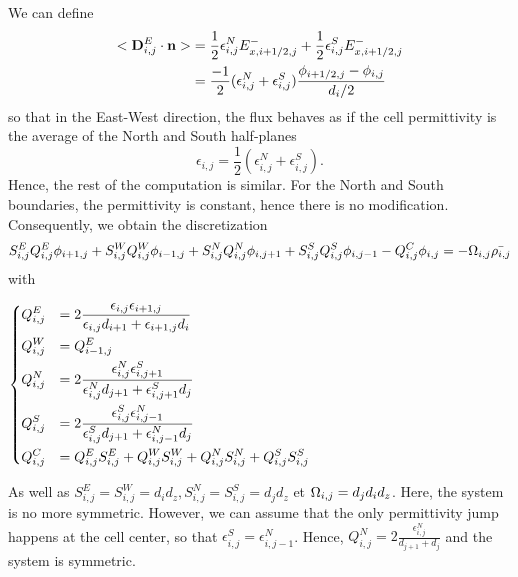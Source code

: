     We can define
    \begin{align}
    <{\mathbf D}^E_{i,j} \cdot {\mathbf n} >&= \frac{1}{2} \epsilon_{i,j}^N E_{x, i+1/2,j}^- + \frac{1}{2} \epsilon_{i,j}^S E_{x, i+1/2,j}^-\\
     &= \frac{-1}{2} (\epsilon_{i,j}^N + \epsilon_{i,j}^S) \frac{\phi_{i+1/2,j} - \phi_{i,j}}{d_i/2}
     \label{eq-flux}
    \end{align}
    so that in the East-West direction, the flux behaves as if the cell permittivity is the average of the North and South half-planes  $$\epsilon_{i,j} = \frac{1}{2} (\epsilon_{i,j}^N + \epsilon_{i,j}^S).$$
    Hence, the rest of the computation is similar.
    For the North and South boundaries, the permittivity is constant, hence there is no modification.
    Consequently, we obtain the discretization
    \begin{equation}
    S^E_{i,j} Q^E_{i,j} \phi_{i+1,j} + S^W_{i,j} Q^W_{i,j} \phi_{i-1,j} + S^N_{i,j} Q^N_{i,j} \phi_{i,j+1} + S^S_{i,j} Q^S_{i,j} \phi_{i,j-1} - Q^C_{i,j} \phi_{i,j} = - \Omega_{i,j} \bar{\rho_{i,j}}
    \label{eq-descretPoissoncentered}
    \end{equation}
    with
    \begin{center}
     $\begin{dcases}
     Q^E_{i,j} &= 2\frac{\epsilon_{i,j} \epsilon_{i+1,j}}{\epsilon_{i,j} d_{i+1} + \epsilon_{i+1,j} d_i} \\
     Q^W_{i,j} &= Q^E_{i-1,j} \\
     Q^N_{i,j} &= 2\frac{\epsilon_{i,j}^N \epsilon_{i,j+1}^S}{\epsilon_{i,j}^N d_{j+1} + \epsilon_{i,j+1}^S d_{j}}\\
     Q^S_{i,j} &= 2\frac{\epsilon_{i,j}^S \epsilon_{i,j-1}^N}{\epsilon_{i,j}^S d_{j+1} + \epsilon_{i,j-1}^N d_{j}} \\
     Q^C_{i,j} &= Q^E_{i,j}S^E_{i,j}+Q^W_{i,j}S^W_{i,j}+Q^N_{i,j}S^N_{i,j}+Q^S_{i,j}S^S_{i,j}
     \end{dcases}$
    \end{center}

    As well as $S^E_{i,j} = S^W_{i,j} =d_id_z, S^N_{i,j} = S^S_{i,j}= d_jd_z$ et $\Omega_{i,j} = d_jd_id_z$.
    Here, the system is no more symmetric.
    However, we can assume that the only permittivity jump happens at the cell center, so that  $\epsilon_{i,j}^S = \epsilon_{i,j-1}^N$.
    Hence, $Q^N_{i,j} = 2\frac{\epsilon_{i,j}^N}{ d_{j+1} + d_{j}}$ and the system is symmetric.

